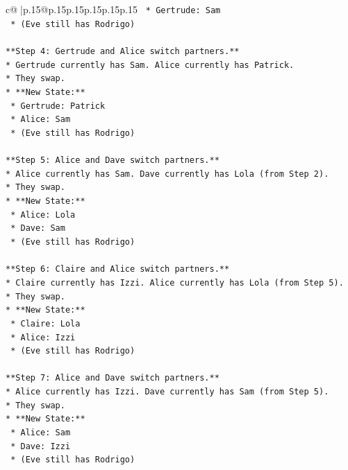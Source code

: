 \documentclass{article}
\begin{document}
{\begin{supertabular}{c@{$\;$}|p{.15\linewidth}@{}p{.15\linewidth}p{.15\linewidth}p{.15\linewidth}p{.15\linewidth}p{.15\linewidth}}
{{{\texttt{    *   Gertrude: Sam} \\
\texttt{    *   (Eve still has Rodrigo)} \\
\\ 
\texttt{**Step 4: Gertrude and Alice switch partners.**} \\
\texttt{*   Gertrude currently has Sam. Alice currently has Patrick.} \\
\texttt{*   They swap.} \\
\texttt{*   **New State:**} \\
\texttt{    *   Gertrude: Patrick} \\
\texttt{    *   Alice: Sam} \\
\texttt{    *   (Eve still has Rodrigo)} \\
\\ 
\texttt{**Step 5: Alice and Dave switch partners.**} \\
\texttt{*   Alice currently has Sam. Dave currently has Lola (from Step 2).} \\
\texttt{*   They swap.} \\
\texttt{*   **New State:**} \\
\texttt{    *   Alice: Lola} \\
\texttt{    *   Dave: Sam} \\
\texttt{    *   (Eve still has Rodrigo)} \\
\\ 
\texttt{**Step 6: Claire and Alice switch partners.**} \\
\texttt{*   Claire currently has Izzi. Alice currently has Lola (from Step 5).} \\
\texttt{*   They swap.} \\
\texttt{*   **New State:**} \\
\texttt{    *   Claire: Lola} \\
\texttt{    *   Alice: Izzi} \\
\texttt{    *   (Eve still has Rodrigo)} \\
\\ 
\texttt{**Step 7: Alice and Dave switch partners.**} \\
\texttt{*   Alice currently has Izzi. Dave currently has Sam (from Step 5).} \\
\texttt{*   They swap.} \\
\texttt{*   **New State:**} \\
\texttt{    *   Alice: Sam} \\
\texttt{    *   Dave: Izzi} \\
\texttt{    *   (Eve still has Rodrigo)} \\
}}}
\end{supertabular}}
\end{document}
